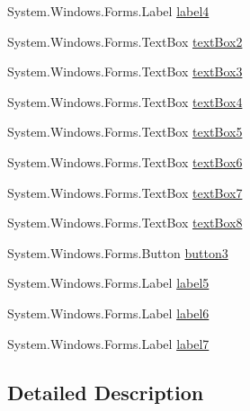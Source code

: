 \begin{DoxyCompactItemize}
\item 
System.\+Windows.\+Forms.\+Label \hyperlink{classProject__Codename__Olympia__v1_1_1__0_1_1ScoringForm_aff242897e95b72d1ad48c90b512f859d}{label4}
\item 
System.\+Windows.\+Forms.\+Text\+Box \hyperlink{classProject__Codename__Olympia__v1_1_1__0_1_1ScoringForm_af5a57b51e4c2c83c66418834b5ff226a}{text\+Box2}
\item 
System.\+Windows.\+Forms.\+Text\+Box \hyperlink{classProject__Codename__Olympia__v1_1_1__0_1_1ScoringForm_a437bf56ba4b2de0a2ec39375006419a1}{text\+Box3}
\item 
System.\+Windows.\+Forms.\+Text\+Box \hyperlink{classProject__Codename__Olympia__v1_1_1__0_1_1ScoringForm_ac1d0a0c98752fb75b0740414a9b2ec81}{text\+Box4}
\item 
System.\+Windows.\+Forms.\+Text\+Box \hyperlink{classProject__Codename__Olympia__v1_1_1__0_1_1ScoringForm_a2ab08e1a40ff604d53fec081a90dae04}{text\+Box5}
\item 
System.\+Windows.\+Forms.\+Text\+Box \hyperlink{classProject__Codename__Olympia__v1_1_1__0_1_1ScoringForm_a5c85e25caf9018cf7e83274c7df44729}{text\+Box6}
\item 
System.\+Windows.\+Forms.\+Text\+Box \hyperlink{classProject__Codename__Olympia__v1_1_1__0_1_1ScoringForm_a379e00e21671639e020eb2ff46a30eeb}{text\+Box7}
\item 
System.\+Windows.\+Forms.\+Text\+Box \hyperlink{classProject__Codename__Olympia__v1_1_1__0_1_1ScoringForm_a1937b608ccb900235fc4102b8704c83c}{text\+Box8}
\item 
System.\+Windows.\+Forms.\+Button \hyperlink{classProject__Codename__Olympia__v1_1_1__0_1_1ScoringForm_a7ac717cf762ee6f76d5cb56d64b3ed9c}{button3}
\item 
System.\+Windows.\+Forms.\+Label \hyperlink{classProject__Codename__Olympia__v1_1_1__0_1_1ScoringForm_a27b6461005d1b3dbaac8c9a9aed1708f}{label5}
\item 
System.\+Windows.\+Forms.\+Label \hyperlink{classProject__Codename__Olympia__v1_1_1__0_1_1ScoringForm_ab629e02b570ecaf21398f2e8fb342f15}{label6}
\item 
System.\+Windows.\+Forms.\+Label \hyperlink{classProject__Codename__Olympia__v1_1_1__0_1_1ScoringForm_afc5b612313aeaa61f418e9c5110df028}{label7}
\end{DoxyCompactItemize}


\subsection{Detailed Description}


